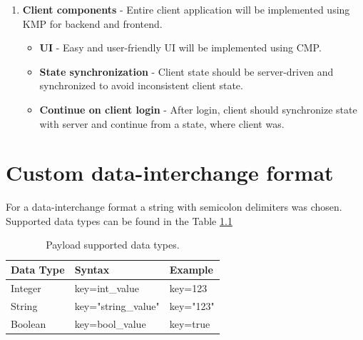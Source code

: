 \documentclass[english, sem, kiv, he, iso690alph, pdf, viewonly]{fasthesis}
\begin{document}
\begin{enumerate}
\begin{itemize}
			\item \textbf{Client timeouts} - if a client has not performed a request for the last \textbf{N} minutes (N is configurable), then the client should be disconnected and related socket should be closed.
			\item \textbf{Invalid client operations} - server should correctly react on any client's invalid operation (malformed request, action which is not possible in the current client state).
			\item \textbf{Client flow state} - each client can be in a one of the flow state: [\textit{LOGIN, MENU, LOBBY, GAME}] \footnote{Described more detailed in the [section ref]}. The client flow state should be synchronized between server and client, and the server value will be the only source of truth \footnote{It means, that a client-side flow state for some reason does not match server-side value, then it should be adjusted on the client side.}.
		\end{itemize}
	\item \textbf{Client components} - Entire client application will be implemented using \ac{KMP} for backend and frontend.
		\begin{itemize}
			\item \textbf{\ac{UI}} - Easy and user-friendly \ac{UI} will be implemented using \ac{CMP}.
			\item \textbf{State synchronization} - Client state should be server-driven and synchronized to avoid inconsistent client state.
			\item \textbf{Continue on client login} - After login, client should synchronize state with server and continue from a state, where client was.
		\end{itemize}
\end{enumerate}

\chapter{Custom data-interchange format}

For a data-interchange format a string with semicolon delimiters was chosen. Supported data types can be found in the Table \ref{tab:payload_data_types}

\begin{table}[h]
	\centering
	\begin{tabular}{|l|l|l|}
		\hline
		\textbf{Data Type} & \textbf{Syntax} & \textbf{Example} \\ \hline
		Integer & key=int_value 		& key=123 				\\ \hline
		String 	& key="string_value"	& key="123"				\\ \hline
		Boolean	& key=bool_value		& key=true				\\ \hline
	\end{tabular}
	\caption{Payload supported data types.}
	\label{tab:payload_data_types}
\end{table}
\end{document}
